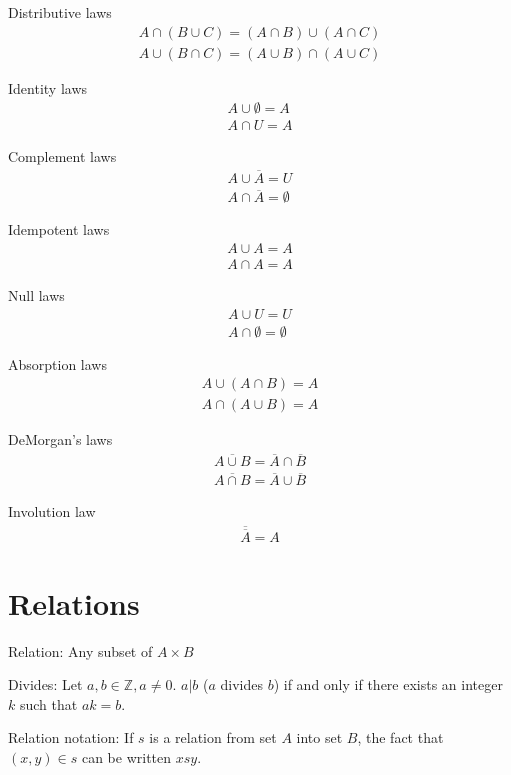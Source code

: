 \documentclass{article}
\begin{document}
Distributive laws
\begin{gather*}
    A \cap (B \cup C) = (A \cap B) \cup (A \cap C) \\
    A \cup (B \cap C) = (A \cup B) \cap (A \cup C)
\end{gather*}

Identity laws
\begin{gather*}
    A \cup \emptyset = A \\
    A \cap U = A
\end{gather*}

Complement laws
\begin{gather*}
    A \cup \overline{A} = U \\
    A \cap \overline{A} = \emptyset
\end{gather*}

Idempotent laws
\begin{gather*}
    A \cup A = A \\
    A \cap A = A
\end{gather*}

Null laws
\begin{gather*}
    A \cup U = U \\
    A \cap \emptyset = \emptyset
\end{gather*}

Absorption laws
\begin{gather*}
    A \cup (A \cap B) = A \\
    A \cap (A \cup B) = A
\end{gather*}

DeMorgan's laws
\begin{gather*}
    \overline{A \cup B} = \overline{A} \cap \overline{B} \\
    \overline{A \cap B} = \overline{A} \cup \overline{B}
\end{gather*}

Involution law
\begin{gather*}
    \overline{\overline{A}} = A
\end{gather*}

\section{Relations}
Relation: Any subset of $A \times B$

Divides: Let $a,b \in \mathbb{Z}, a \neq 0$. $a | b$ ($a$ divides $b$) if and only if there exists an integer $k$ such that $ak = b$.

Relation notation: If $s$ is a relation from set $A$ into set $B$, the fact that $(x, y) \in s$ can be written $xsy$.
\end{document}
